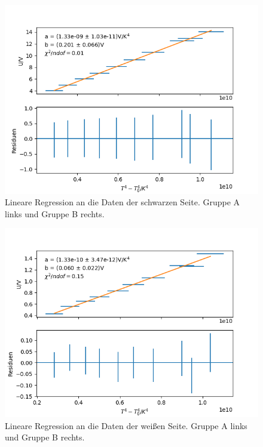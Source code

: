 \documentclass[12pt,a4paper]{article}
\begin{document}
\begin{figure}
\includegraphics[scale=0.5]{Bilder/Schwarz_A}
\caption{Lineare Regression an die Daten der schwarzen Seite. Gruppe A links und Gruppe B rechts.}
\label{fig:RegSchwarz}
\end{figure}

\begin{figure}
\includegraphics[scale=0.5]{Bilder/Weiss_A}
\caption{Lineare Regression an die Daten der weißen Seite. Gruppe A links und Gruppe B rechts.}
\label{fig:RegWeiss}
\end{figure}
\end{document}
